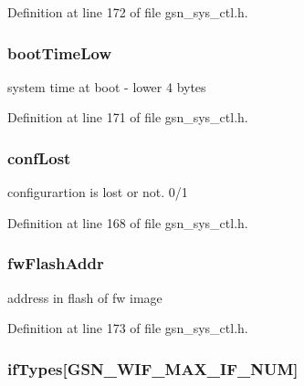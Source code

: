 Definition at line 172 of file gsn\_\-sys\_\-ctl.h.

\hypertarget{a00247_ac4320494d78b18891e3da4896e6ab01d}{
\subsubsection[{bootTimeLow}]{ {\bf bootTimeLow}}}
\label{a00247_ac4320494d78b18891e3da4896e6ab01d}
system time at boot -\/ lower 4 bytes 

Definition at line 171 of file gsn\_\-sys\_\-ctl.h.

\hypertarget{a00247_a3396d2d09670a292ab8f4d6a9e8d75fb}{
\subsubsection[{confLost}]{ {\bf confLost}}}
\label{a00247_a3396d2d09670a292ab8f4d6a9e8d75fb}
configurartion is lost or not. 0/1 

Definition at line 168 of file gsn\_\-sys\_\-ctl.h.

\hypertarget{a00247_a227fcb5ac22283fc4d90e07a8363f7a5}{
\subsubsection[{fwFlashAddr}]{ {\bf fwFlashAddr}}}
\label{a00247_a227fcb5ac22283fc4d90e07a8363f7a5}
address in flash of fw image 

Definition at line 173 of file gsn\_\-sys\_\-ctl.h.

\hypertarget{a00247_a9cbf66db07b0b8d7e92f702d2e6896a8}{
\subsubsection[{ifTypes}]{ {\bf ifTypes}\mbox{[}GSN\_\-WIF\_\-MAX\_\-IF\_\-NUM\mbox{]}}}
\label{a00247_a9cbf66db07b0b8d7e92f702d2e6896a8}


